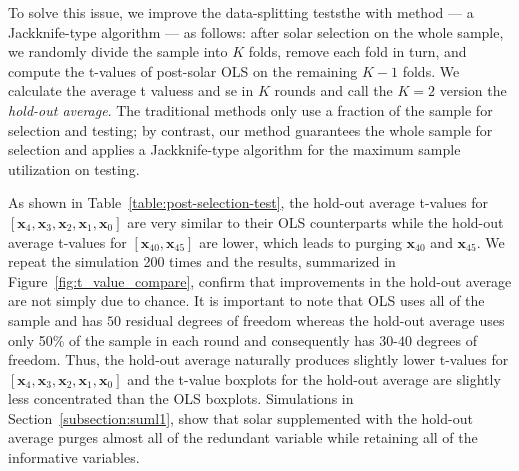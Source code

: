 \documentclass[12pt]{article}
\begin{document}
To solve this issue, we improve the data-splitting teststhe with \citet{bousquet2002stability} method --- a Jackknife-type algorithm --- as follows: after solar selection on the whole sample, we randomly divide the sample into $K$ folds, remove each fold in turn, and compute the t-values of post-solar OLS on the remaining $K-1$ folds. We calculate the average t valuess and se in $K$ rounds and call the $K=2$ version the \emph{hold-out average}. The traditional \citet{wasserman2009high, meinshausen2009p} methods only use a fraction of the sample for selection and testing; by contrast, our method guarantees the whole sample for selection and applies a Jackknife-type algorithm for the maximum sample utilization on testing.

As shown in Table~\ref{table:post-selection-test}, the hold-out average t-values for $\left[\mathbf{x}_4, \mathbf{x}_3, \mathbf{x}_2, \mathbf{x}_1, \mathbf{x}_0\right]$ are very similar to their OLS counterparts while the hold-out average t-values for $\left[\mathbf{x}_{40}, \mathbf{x}_{45} \right]$ are lower, which leads to purging $\mathbf{x}_{40}$ and $\mathbf{x}_{45}$. We repeat the simulation 200 times and the results, summarized in Figure~\ref{fig:t_value_compare}, confirm that improvements in the hold-out average are not simply due to chance. It is important to note that OLS uses all of the sample and has $50$ residual degrees of freedom whereas the hold-out average uses only 50\% of the sample in each round and consequently has $30$-$40$ degrees of freedom. Thus, the hold-out average naturally produces slightly lower t-values for $\left[\mathbf{x}_4, \mathbf{x}_3, \mathbf{x}_2, \mathbf{x}_1, \mathbf{x}_0\right]$ and the t-value boxplots for the hold-out average are slightly less concentrated than the OLS boxplots. Simulations in Section~\ref{subsection:suml1}, show that solar supplemented with the hold-out average purges almost all of the redundant variable while retaining all of the informative variables.
\end{document}
